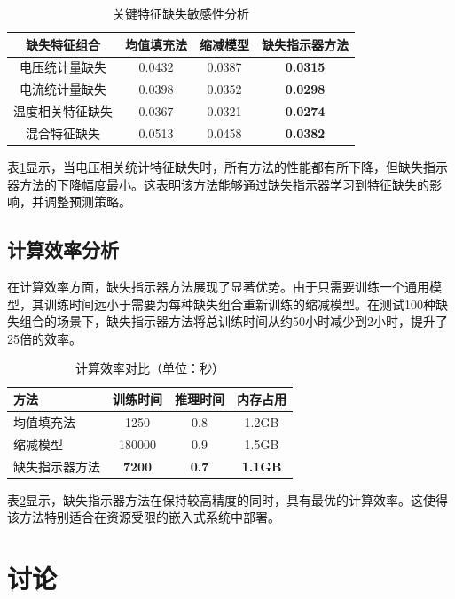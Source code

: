 \documentclass{ctexart}
\begin{document}
\begin{table}[htbp]
\centering
\caption{关键特征缺失敏感性分析}
\label{tab:feature_sensitivity}
\begin{tabular}{cccc}
\toprule
缺失特征组合 & 均值填充法 & 缩减模型 & 缺失指示器方法 \\
\midrule
电压统计量缺失 & 0.0432 & 0.0387 & \textbf{0.0315} \\
电流统计量缺失 & 0.0398 & 0.0352 & \textbf{0.0298} \\
温度相关特征缺失 & 0.0367 & 0.0321 & \textbf{0.0274} \\
混合特征缺失 & 0.0513 & 0.0458 & \textbf{0.0382} \\
\bottomrule
\end{tabular}
\end{table}

表\ref{tab:feature_sensitivity}显示，当电压相关统计特征缺失时，所有方法的性能都有所下降，但缺失指示器方法的下降幅度最小。这表明该方法能够通过缺失指示器学习到特征缺失的影响，并调整预测策略。

\subsection{计算效率分析}
在计算效率方面，缺失指示器方法展现了显著优势。由于只需要训练一个通用模型，其训练时间远小于需要为每种缺失组合重新训练的缩减模型。在测试100种缺失组合的场景下，缺失指示器方法将总训练时间从约50小时减少到2小时，提升了25倍的效率。

\begin{table}[htbp]
\centering
\caption{计算效率对比（单位：秒）}
\label{tab:efficiency}
\begin{tabular}{lccc}
\toprule
方法 & 训练时间 & 推理时间 & 内存占用 \\
\midrule
均值填充法 & 1250 & 0.8 & 1.2GB \\
缩减模型 & 180000 & 0.9 & 1.5GB \\
缺失指示器方法 & \textbf{7200} & \textbf{0.7} & \textbf{1.1GB} \\
\bottomrule
\end{tabular}
\end{table}

表\ref{tab:efficiency}显示，缺失指示器方法在保持较高精度的同时，具有最优的计算效率。这使得该方法特别适合在资源受限的嵌入式系统中部署。

\section{讨论}
\end{document}
